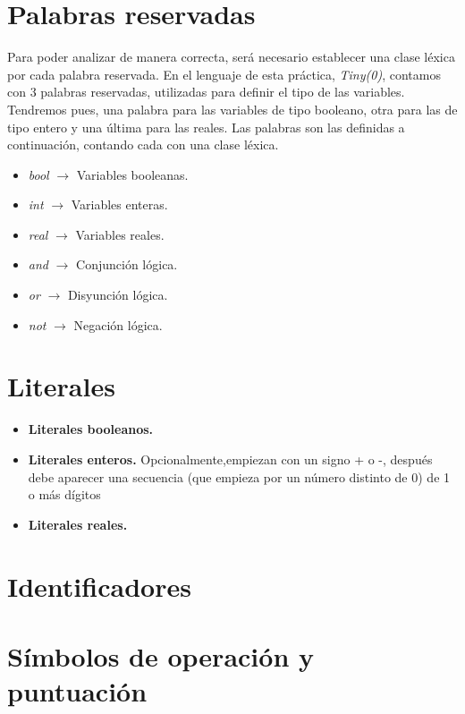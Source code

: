 
\section{Palabras reservadas}

Para poder analizar de manera correcta, será necesario establecer una clase léxica por cada palabra reservada. En el lenguaje de
esta práctica, \textit{Tiny(0)}, contamos con 3 palabras reservadas, utilizadas para definir el tipo de las variables. Tendremos pues,
una palabra para las variables de tipo booleano, otra para las de tipo entero y una última para las reales. Las palabras son 
las definidas a continuación, contando cada con una clase léxica.

\begin{itemize}
    \item \textit{bool} $\rightarrow$ Variables booleanas.
    \item \textit{int} $\rightarrow$ Variables enteras.
    \item \textit{real} $\rightarrow$ Variables reales.
    \item \textit{and} $\rightarrow$ Conjunción lógica.
    \item \textit{or} $\rightarrow$ Disyunción lógica.
    \item \textit{not} $\rightarrow$ Negación lógica.
\end{itemize}

\section{Literales}

\begin{itemize}
    \item \textbf{Literales booleanos.} 
    \item \textbf{Literales enteros.} Opcionalmente,empiezan con un signo + o -, después debe aparecer una secuencia (que empieza por un número distinto de 0) de 1 o más dígitos 
    \item \textbf{Literales reales.}
\end{itemize}

\section{Identificadores}

\section{Símbolos de operación y puntuación}

